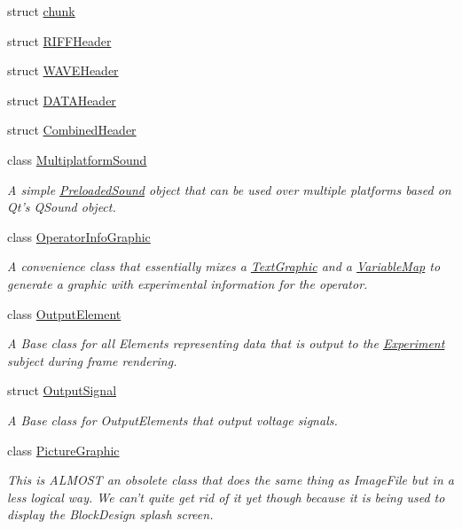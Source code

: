 \begin{DoxyCompactItemize}
struct \hyperlink{struct_picto_1_1chunk}{chunk}
\item 
struct \hyperlink{struct_picto_1_1_r_i_f_f_header}{R\-I\-F\-F\-Header}
\item 
struct \hyperlink{struct_picto_1_1_w_a_v_e_header}{W\-A\-V\-E\-Header}
\item 
struct \hyperlink{struct_picto_1_1_d_a_t_a_header}{D\-A\-T\-A\-Header}
\item 
struct \hyperlink{struct_picto_1_1_combined_header}{Combined\-Header}
\item 
class \hyperlink{class_picto_1_1_multiplatform_sound}{Multiplatform\-Sound}
\begin{DoxyCompactList}\small\item\em A simple \hyperlink{class_picto_1_1_preloaded_sound}{Preloaded\-Sound} object that can be used over multiple platforms based on Qt's Q\-Sound object. \end{DoxyCompactList}\item 
class \hyperlink{class_picto_1_1_operator_info_graphic}{Operator\-Info\-Graphic}
\begin{DoxyCompactList}\small\item\em A convenience class that essentially mixes a \hyperlink{class_picto_1_1_text_graphic}{Text\-Graphic} and a \hyperlink{class_picto_1_1_variable_map}{Variable\-Map} to generate a graphic with experimental information for the operator. \end{DoxyCompactList}\item 
class \hyperlink{class_picto_1_1_output_element}{Output\-Element}
\begin{DoxyCompactList}\small\item\em A Base class for all Elements representing data that is output to the \hyperlink{class_picto_1_1_experiment}{Experiment} subject during frame rendering. \end{DoxyCompactList}\item 
struct \hyperlink{struct_picto_1_1_output_signal}{Output\-Signal}
\begin{DoxyCompactList}\small\item\em A Base class for Output\-Elements that output voltage signals. \end{DoxyCompactList}\item 
class \hyperlink{class_picto_1_1_picture_graphic}{Picture\-Graphic}
\begin{DoxyCompactList}\small\item\em This is A\-L\-M\-O\-S\-T an obsolete class that does the same thing as Image\-File but in a less logical way. We can't quite get rid of it yet though because it is being used to display the Block\-Design splash screen. \end{DoxyCompactList}\item 

\end{DoxyCompactItemize}
